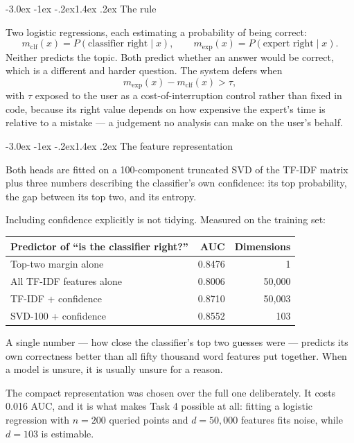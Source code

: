 \documentclass[11pt,a4paper]{article}
\makeatletter
\renewcommand\subsection{\@startsection{subsection}{2}{\z@}%
  {-3.0ex \@plus -1ex \@minus -.2ex}{1.4ex \@plus .2ex}%
  {\normalfont\large\sffamily\bfseries\color{accent}}}
\makeatother
\begin{document}
\subsection{The rule}

Two logistic regressions, each estimating a probability of being correct:
\[
  m_{\text{clf}}(x) = P(\text{classifier right} \mid x), \qquad
  m_{\text{exp}}(x) = P(\text{expert right} \mid x).
\]
Neither predicts the topic. Both predict whether an answer would be correct,
which is a different and harder question. The system defers when
\[
  m_{\text{exp}}(x) - m_{\text{clf}}(x) > \tau ,
\]
with $\tau$ exposed to the user as a cost-of-interruption control rather than
fixed in code, because its right value depends on how expensive the expert's time
is relative to a mistake --- a judgement no analysis can make on the user's
behalf.

\subsection{The feature representation}
\label{sec:confidence}

Both heads are fitted on a 100-component truncated SVD of the TF-IDF matrix plus
three numbers describing the classifier's own confidence: its top probability,
the gap between its top two, and its entropy.

Including confidence explicitly is not tidying. Measured on the training set:

\begin{center}
\small
\begin{tabular}{@{}lrr@{}}
\toprule
\textbf{Predictor of ``is the classifier right?''} & \textbf{AUC} & \textbf{Dimensions} \\
\midrule
Top-two margin alone            & 0.8476 & 1 \\
All TF-IDF features alone       & 0.8006 & 50{,}000 \\
TF-IDF + confidence             & 0.8710 & 50{,}003 \\
SVD-100 + confidence            & 0.8552 & 103 \\
\bottomrule
\end{tabular}
\end{center}

A single number --- how close the classifier's top two guesses were --- predicts
its own correctness better than all fifty thousand word features put together.
When a model is unsure, it is usually unsure for a reason.

The compact representation was chosen over the full one deliberately. It costs
0.016 AUC, and it is what makes Task 4 possible at all: fitting a logistic
regression with $n = 200$ queried points and $d = 50{,}000$ features fits noise,
while $d = 103$ is estimable.
\end{document}

